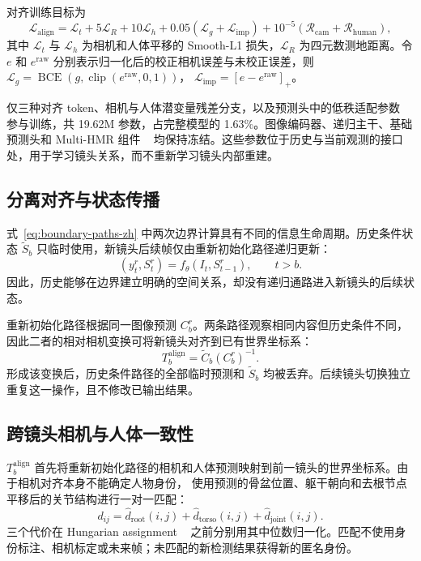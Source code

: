 \medskip
对齐训练目标为
\begin{equation}
 \mathcal L_{\mathrm{align}}=\mathcal L_t+5\mathcal L_R+10\mathcal L_h
 +0.05(\mathcal L_g+\mathcal L_{\mathrm{imp}})
 +10^{-5}(\mathcal R_{\mathrm{cam}}+\mathcal R_{\mathrm{human}}),
 \label{eq:alignment-objective-zh}
\end{equation}
其中 $\mathcal L_t$ 与 $\mathcal L_h$ 为相机和人体平移的 Smooth-L1 损失，$\mathcal L_R$ 为四元数测地距离。令 $e$ 和 $e^{\mathrm{raw}}$ 分别表示归一化后的校正相机误差与未校正误差，则
$\mathcal L_g=\operatorname{BCE}(g,\operatorname{clip}(e^{\mathrm{raw}},0,1))$，
$\mathcal L_{\mathrm{imp}}=[e-e^{\mathrm{raw}}]_+$。

仅三种对齐 token、相机与人体潜变量残差分支，以及预测头中的低秩适配参数
~\citep{hu2022lora}
参与训练，共 19.62M 参数，占完整模型的 1.63\%。图像编码器、递归主干、基础预测头和 Multi-HMR 组件
~\citep{baradel2024multihmr}
均保持冻结。这些参数位于历史与当前观测的接口处，用于学习镜头关系，而不重新学习镜头内部重建。

\subsection{分离对齐与状态传播}

式~\ref{eq:boundary-paths-zh} 中两次边界计算具有不同的信息生命周期。历史条件状态 $\widetilde S_b$ 只临时使用，新镜头后续帧仅由重新初始化路径递归更新：
\begin{equation}
 (y_t^r,S_t^r)=f_\theta(I_t,S_{t-1}^r),\qquad t>b.
\label{eq:dual-path-zh}
\end{equation}
因此，历史能够在边界建立明确的空间关系，却没有递归通路进入新镜头的后续状态。

重新初始化路径根据同一图像预测 $C_b^r$。两条路径观察相同内容但历史条件不同，因此二者的相对相机变换可将新镜头对齐到已有世界坐标系：
\begin{equation}
 T_b^{\mathrm{align}}=\widetilde C_b(C_b^r)^{-1}.
 \label{eq:inter-shot-alignment-zh}
\end{equation}
形成该变换后，历史条件路径的全部临时预测和 $\widetilde S_b$ 均被丢弃。后续镜头切换独立重复这一操作，且不修改已输出结果。

\subsection{跨镜头相机与人体一致性}

$T_b^{\mathrm{align}}$ 首先将重新初始化路径的相机和人体预测映射到前一镜头的世界坐标系。由于相机对齐本身不能确定人物身份，\method{} 使用预测的骨盆位置、躯干朝向和去根节点平移后的关节结构进行一对一匹配：
\begin{equation}
 d_{ij}=\widehat d_{\mathrm{root}}(i,j)+
        \widehat d_{\mathrm{torso}}(i,j)+
        \widehat d_{\mathrm{joint}}(i,j).
 \label{eq:association-cost-zh}
\end{equation}
三个代价在 Hungarian assignment
~\citep{munkres1957assignment}
之前分别用其中位数归一化。匹配不使用身份标注、相机标定或未来帧；未匹配的新检测结果获得新的匿名身份。

